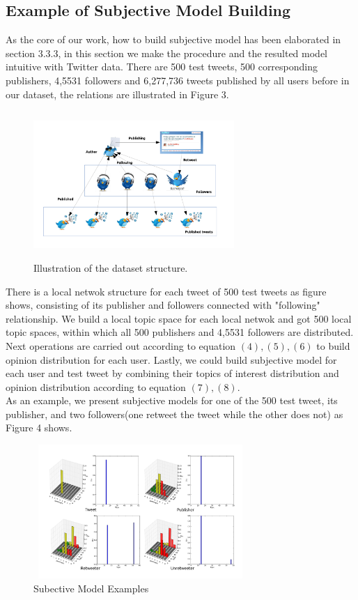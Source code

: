 \documentclass{acm_proc_article-sp}
\begin{document}
\subsection{Example of Subjective Model Building}
As the core of our work, how to build subjective model has been elaborated in section 3.3.3, in this section we make the procedure and the resulted model intuitive with Twitter data. 
There are 500 test tweets, 500 corresponding publishers, 4,5531 followers and 6,277,736 tweets published by all users before in our dataset, the relations are illustrated in Figure 3.
\begin{figure}
\centering
\includegraphics[width=3.0in,height=2.2in]{dataset.pdf}
\caption{Illustration of the dataset structure.}
\label{fig:graph3}
\end{figure}
There is a local netwok structure for each tweet of 500 test tweets as figure shows, consisting of its publisher and followers connected with "following" relationship.
We build a local topic space for each local netwok and got 500 local topic spaces, within which all 500 publishers and 4,5531 followers are distributed.
Next operations are carried out according to equation $ \mathrm{\left( 4 \right), \left( 5 \right), \left( 6 \right) } $ to build opinion distribution for each user.
Lastly, we could build subjective model for each user and test tweet by combining their topics of interest distribution and opinion distribution according to equation $ \mathrm{\left( 7 \right), \left( 8 \right) } $.\\
As an example, we present subjective models for one of the 500 test tweet, its publisher, and two followers(one retweet the tweet while the other does not) as Figure 4 shows.
\begin{figure}
\centering
\includegraphics[width=3.2in,height=2.0in]{tweets10.pdf}
\caption{Subective Model Examples}
\label{fig:graph4}
\end{figure}
\end{document}
